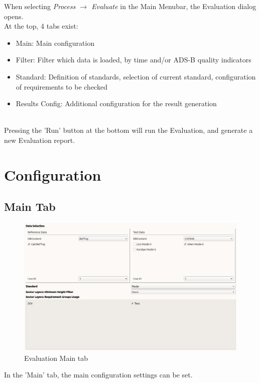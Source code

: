 When selecting \textit{Process $\rightarrow$ Evaluate} in the Main Menubar, the Evaluation dialog opens. \\

At the top, 4 tabs exist:
\begin{itemize}  
\item Main: Main configuration
\item Filter: Filter which data is loaded, by time and/or ADS-B quality indicators
\item Standard: Definition of standards, selection of current standard, configuration of requirements to be checked
\item Results Config: Additional configuration for the result generation
\end{itemize}
\ \\

Pressing the 'Run' button at the bottom will run the Evaluation, and generate a new Evaluation report.

\section{Configuration}
\label{sec:eval_config} 

\subsection{Main Tab}

\begin{figure}[H]
  \hspace*{-2cm}
    \includegraphics[width=18cm,frame]{figures/eval_main.png}
  \caption{Evaluation Main tab}
\end{figure}

In the 'Main' tab, the main configuration settings can be set. \\


